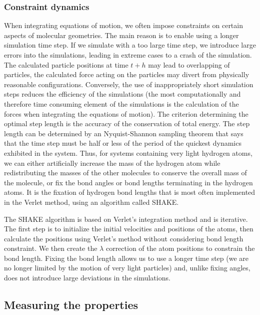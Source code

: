 \subsubsection{Constraint dynamics}

When integrating equations of motion, we often impose constraints on certain aspects of molecular geometries. The main reason is to enable using a longer simulation time step. If we simulate with a too large time step, we introduce large errors into the simulations, leading in extreme cases to a crash of the simulation. The calculated particle positions at time $t+h$ may lead to overlapping of particles, the calculated force acting on the particles may divert from physically reasonable configurations. Conversely, the use of inappropriately short simulation steps reduces the efficiency of the simulations (the most computationally and therefore time consuming element of the simulations is the calculation of the forces when integrating the equations of motion). \cite{mdskripta} The criterion determining the optimal step length is the accuracy of the conservation of total energy. The step length can be determined by an Nyquist-Shannon \cite{shannon_communication_1949} sampling theorem that says that the time step must be half or less of the period of the quickest dynamics exhibited in the system. Thus, for systems containing very light hydrogen atoms, we can either artificially increase the mass of the hydrogen atom while redistributing the masses of the other molecules to conserve the overall mass of the molecule, or fix the bond angles or bond lengths terminating in the hydrogen atoms. It is the fixation of hydrogen bond lengths that is most often implemented in the Verlet method, using an algorithm called SHAKE. 

The SHAKE algorithm \cite{ryckaert_numerical_1977} is based on Verlet's integration method and is iterative. The first step is to initialize the initial velocities and positions of the atoms, then calculate the positions using Verlet's method without considering bond length constraint. We then create the $\lambda$ correction of the atom positions to constrain the bond length. Fixing the bond length allows us to use a longer time step (we are no longer limited by the motion of very light particles) and, unlike fixing angles, does not introduce large deviations in the simulations.

\subsection{Measuring the properties}
